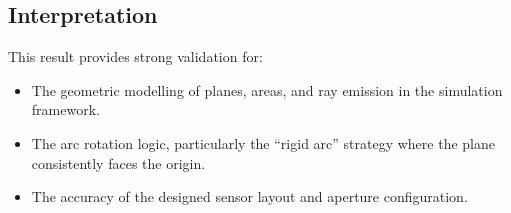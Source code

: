 \subsection*{Interpretation}
This result provides strong validation for:
\begin{itemize}
    \item The geometric modelling of planes, areas, and ray emission in the simulation framework.
    \item The arc rotation logic, particularly the ``rigid arc'' strategy where the plane consistently faces the origin.
    \item The accuracy of the designed sensor layout and aperture configuration.
\end{itemize}


%

